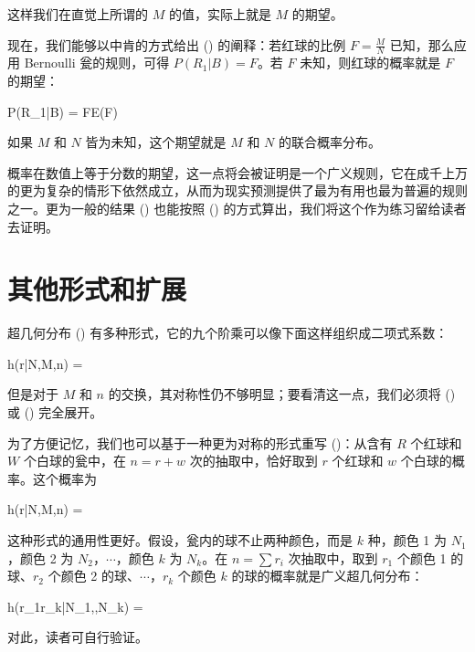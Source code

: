 这样我们在直觉上所谓的 $M$ 的值，实际上就是 $M$ 的期望。

现在，我们能够以中肯的方式给出 (\in[3-63]) 的阐释：若红球的比例 $F = \frac{M}{N}$ 已知，那么应用 Bernoulli 瓮的规则，可得 $P(R_1|B) = F$。若 $F$ 未知，则红球的概率就是 $F$ 的期望：

\placeformula[3-72]
\startformula
P(R_1|B) = \langle F\rangle \equiv E(F)
\stopformula

如果 $M$ 和 $N$ 皆为未知，这个期望就是 $M$ 和 $N$ 的联合概率分布。

概率在数值上等于分数的期望，这一点将会被证明是一个广义规则，它在成千上万的更为复杂的情形下依然成立，从而为现实预测提供了最为有用也最为普遍的规则之一。更为一般的结果 (\in[3-56]) 也能按照 (\in[3-72]) 的方式算出，我们将这个作为练习留给读者去证明。

\section{其他形式和扩展}

超几何分布 (\in[3-22]) 有多种形式，它的九个阶乘可以像下面这样组织成二项式系数：

\placeformula[3-73]
\startformula
h(r|N,M,n) = 
\stopformula

但是对于 $M$ 和 $n$ 的交换，其对称性仍不够明显；要看清这一点，我们必须将 (\in[3-22]) 或 (\in[3-73]) 完全展开。

为了方便记忆，我们也可以基于一种更为对称的形式重写 (\in[3-22])：从含有 $R$ 个红球和 $W$ 个白球的瓮中，在 $n = r + w$ 次的抽取中，恰好取到 $r$ 个红球和 $w$ 个白球的概率。这个概率为

\placeformula[3-74]
\startformula
h(r|N,M,n) = 
\stopformula

这种形式的通用性更好。假设，瓮内的球不止两种颜色，而是 $k$ 种，颜色 1 为 $N_1$，颜色 2 为 $N_2$，$\cdots$，颜色 $k$ 为 $N_k$。在 $n = \sum r_i$ 次抽取中，取到 $r_1$ 个颜色 1 的球、$r_2$ 个颜色 2 的球、$\cdots$，$r_k$ 个颜色 $k$ 的球的概率就是广义超几何分布：

\placeformula[3-75]
\startformula
h(r_1\cdots r_k|N_1,\cdots,N_k) = 
\stopformula

对此，读者可自行验证。


